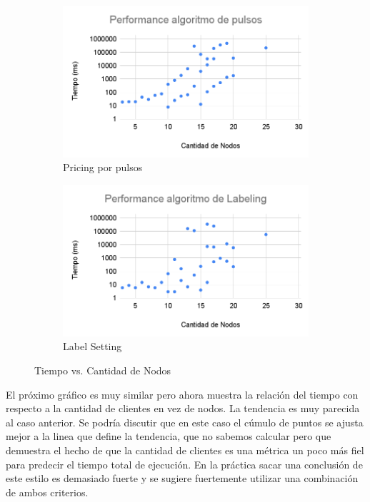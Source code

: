 \begin{figure}[H]
     \begin{subfigure}[b]{0.45\textwidth}
         \centering
         \includegraphics[width=\textwidth]{img/Performance algoritmo de pulsos.png}
         \caption{Pricing por pulsos}
     \end{subfigure}
     \hfill
     \begin{subfigure}[b]{0.45\textwidth}
         \centering
         \includegraphics[width=\textwidth]{img/Performance algoritmo de Labeling.png}
         \caption{Label Setting}
     \end{subfigure}

        \caption{Tiempo vs. Cantidad de Nodos}
        \label{fig:performance-nodes}
\end{figure}

El próximo gráfico es muy similar pero ahora muestra la relación del tiempo con respecto a la cantidad de clientes en vez de nodos. La tendencia es muy parecida al caso anterior. Se podría discutir que en este caso el cúmulo de puntos se ajusta mejor a la linea que define la tendencia, que no sabemos calcular pero que demuestra el hecho de que la cantidad de clientes es una métrica un poco más fiel para predecir el tiempo total de ejecución. En la práctica sacar una conclusión de este estilo es demasiado fuerte y se sugiere fuertemente utilizar una combinación de ambos criterios.


